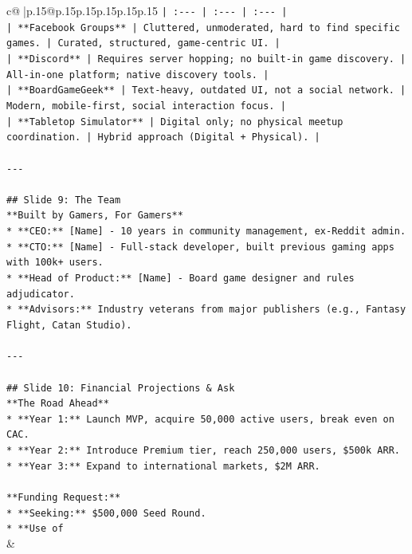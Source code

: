 \documentclass{article}
\begin{document}
{\begin{supertabular}{c@{$\;$}|p{.15\linewidth}@{}p{.15\linewidth}p{.15\linewidth}p{.15\linewidth}p{.15\linewidth}p{.15\linewidth}}
{{{\texttt{| :{-}{-}{-} | :{-}{-}{-} | :{-}{-}{-} |} \\
\texttt{| **Facebook Groups** | Cluttered, unmoderated, hard to find specific games. | Curated, structured, game{-}centric UI. |} \\
\texttt{| **Discord** | Requires server hopping; no built{-}in game discovery. | All{-}in{-}one platform; native discovery tools. |} \\
\texttt{| **BoardGameGeek** | Text{-}heavy, outdated UI, not a social network. | Modern, mobile{-}first, social interaction focus. |} \\
\texttt{| **Tabletop Simulator** | Digital only; no physical meetup coordination. | Hybrid approach (Digital + Physical). |} \\
\\ 
\texttt{{-}{-}{-}} \\
\\ 
\texttt{\#\# Slide 9: The Team} \\
\texttt{**Built by Gamers, For Gamers**} \\
\texttt{*   **CEO:** {[}Name{]} {-} 10 years in community management, ex{-}Reddit admin.} \\
\texttt{*   **CTO:** {[}Name{]} {-} Full{-}stack developer, built previous gaming apps with 100k+ users.} \\
\texttt{*   **Head of Product:** {[}Name{]} {-} Board game designer and rules adjudicator.} \\
\texttt{*   **Advisors:** Industry veterans from major publishers (e.g., Fantasy Flight, Catan Studio).} \\
\\ 
\texttt{{-}{-}{-}} \\
\\ 
\texttt{\#\# Slide 10: Financial Projections \& Ask} \\
\texttt{**The Road Ahead**} \\
\texttt{*   **Year 1:** Launch MVP, acquire 50,000 active users, break even on CAC.} \\
\texttt{*   **Year 2:** Introduce Premium tier, reach 250,000 users, \$500k ARR.} \\
\texttt{*   **Year 3:** Expand to international markets, \$2M ARR.} \\
\\ 
\texttt{**Funding Request:**} \\
\texttt{*   **Seeking:** \$500,000 Seed Round.} \\
\texttt{*   **Use of} \\
            }
        }
    }
    & \\ \\


\end{supertabular}}
\end{document}
